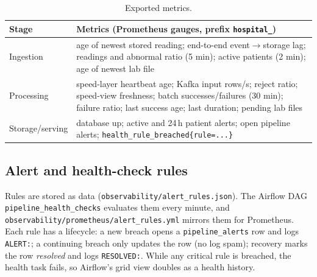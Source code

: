 \documentclass[11pt,a4paper]{article}
\newcommand{\code}[1]{\nolinkurl{#1}}
\begin{document}
\begin{table}[!ht]
\centering\small
\begin{tabularx}{\textwidth}{@{}P{2.4cm}L@{}}
\toprule
\textbf{Stage} & \textbf{Metrics (Prometheus gauges, prefix \code{hospital_})} \\
\midrule
Ingestion & age of newest stored reading; end-to-end event$\rightarrow$storage lag; readings and abnormal ratio (5 min); active patients (2 min); age of newest lab file \\
Processing & speed-layer heartbeat age; Kafka input rows/s; reject ratio; speed-view freshness; batch successes/failures (30 min); failure ratio; last success age; last duration; pending lab files \\
Storage/serving & database up; active and 24\,h patient alerts; open pipeline alerts; \code{health_rule_breached{rule=...}} \\
\bottomrule
\end{tabularx}
\caption{Exported metrics.}
\label{tab:metrics}
\end{table}

\subsection{Alert and health-check rules}
Rules are stored as data (\code{observability/alert_rules.json}). The Airflow DAG
\code{pipeline_health_checks} evaluates them every minute, and \code{observability/prometheus/alert_rules.yml}
mirrors them for Prometheus. Each rule has a lifecycle: a new breach opens a
\code{pipeline_alerts} row and logs \code{ALERT:}; a continuing breach only updates the row (no
log spam); recovery marks the row \emph{resolved} and logs \code{RESOLVED:}. While any critical
rule is breached, the health task fails, so Airflow's grid view doubles as a health history.
\end{document}
